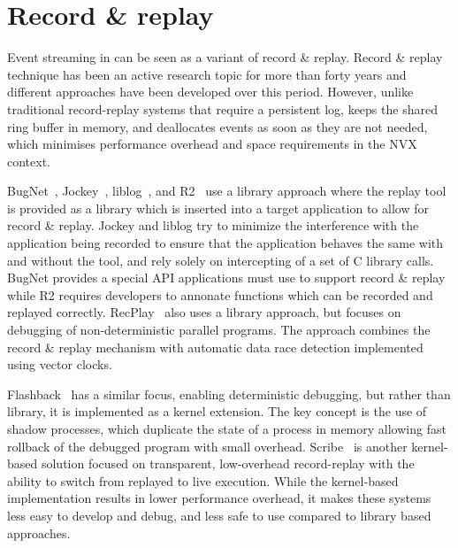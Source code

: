 \section{Record \& replay}
\label{related:record}

Event streaming in \varan can be seen as a variant of record \& replay. Record
\& replay technique has been an active research topic for more than forty years
and different approaches have been developed over this period. However, unlike
traditional record-replay systems that require a persistent log, \varan keeps
the shared ring buffer in memory, and deallocates events as soon as they are
not needed, which minimises performance overhead and space requirements in the
NVX context.


BugNet~\cite{bugnet}, Jockey~\cite{jockey}, liblog~\cite{geels06}, and
R2~\cite{r2} use a library approach where the replay tool is provided as a
library which is inserted into a target application to allow for record \&
replay. Jockey and liblog try to minimize the interference with the application
being recorded to ensure that the application behaves the same with and without
the tool, and rely solely on intercepting of a set of C library calls. BugNet
provides a special API applications must use to support record \& replay while
R2 requires developers to annonate functions which can be recorded and replayed
correctly. RecPlay~\cite{recplay} also uses a library approach, but focuses on
debugging of non-deterministic parallel programs. The approach combines the
record \& replay mechanism with automatic data race detection implemented using
vector clocks.

Flashback~\cite{flashback} has a similar focus, enabling deterministic
debugging, but rather than library, it is implemented as a kernel extension.
The key concept is the use of shadow processes, which duplicate the state of a
process in memory allowing fast rollback of the debugged program with small
overhead. Scribe~\cite{scribe} is another kernel-based solution focused on
transparent, low-overhead record-replay with the ability to switch from
replayed to live execution. While the kernel-based implementation results in
lower performance overhead, it makes these systems less easy to develop and
debug, and less safe to use compared to library based approaches.

